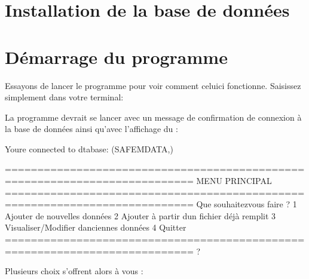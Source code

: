 \documentclass[letterpaper,10pt,french]{sphinxmanual}
\begin{document}
\section{Installation de la base de données}
\label{\detokenize{install:installation-de-la-base-de-donnees}}

\section{Démarrage du programme}
\label{\detokenize{install:demarrage-du-programme}}
\sphinxAtStartPar
Essayons de lancer le programme pour voir comment celui\sphinxhyphen{}ci fonctionne. Saisissez simplement dans votre terminal:

\begin{sphinxVerbatim}[commandchars=\\\{\}]
 
\end{sphinxVerbatim}

\sphinxAtStartPar
La programme devrait se lancer avec un message de confirmation de connexion à la base de données ainsi qu’avec l’affichage
du :

\begin{sphinxVerbatim}[commandchars=\\\{\}]
You\PYGZsq{}re connected to dtabase:  (\PYGZsq{}SAFEM\PYGZus{}DATA\PYGZsq{},)

===========================================================================
MENU PRINCIPAL
===========================================================================
Que souhaitez\PYGZhy{}vous faire ?
1 \PYGZhy{} Ajouter de nouvelles données
2 \PYGZhy{} Ajouter à partir d\PYGZsq{}un fichier déjà remplit
3 \PYGZhy{} Visualiser/Modifier d\PYGZsq{}anciennes données
4 \PYGZhy{} Quitter
===========================================================================
?
\end{sphinxVerbatim}

\sphinxAtStartPar
Plusieurs choix s’offrent alors à vous :

\sphinxAtStartPar
{\hyperref[\detokenize{adddata:add}]{}}

\sphinxAtStartPar
{\hyperref[\detokenize{modifydata:modify}]{}}
\end{document}
